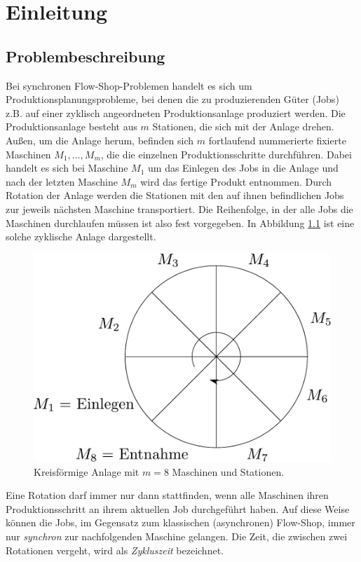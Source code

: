 \documentclass{scrreprt}
\begin{document}
\tableofcontents

\chapter{Einleitung}
\section{Problembeschreibung}
\label{sec:Problembeschreibung}
Bei synchronen Flow-Shop-Problemen handelt es sich um Produktions\-planungs\-probleme,
bei denen die zu produzierenden Güter (Jobs) z.B. auf einer zyklisch angeordneten Produktionsanlage
produziert werden. Die Produktionsanlage be\-steht aus $m$ Stationen, die sich mit der Anlage drehen.
Außen, um die Anlage herum, befinden sich $m$ fortlaufend nummerierte fixierte Maschinen $M_1,\ldots,M_m$, die die einzelnen Produktionsschritte durchführen.
Dabei handelt es sich bei Maschine $M_1$ um das Einlegen des Jobs in die Anlage und nach der letzten Maschine $M_m$ wird das fertige Produkt entnommen.
Durch Rotation der Anlage werden die Stationen mit den auf ihnen befindlichen Jobs zur jeweils nächsten Maschine transportiert.
Die Reihenfolge, in der alle Jobs die Maschinen durchlaufen müssen ist also fest vorgegeben.
In Abbildung \ref{abb:Anlage} ist eine solche zyklische Anlage dargestellt.
\begin{figure}[h]
    \begin{center}
        \includegraphics[width=.6\textwidth]{graphics/anlage.pdf}
    \end{center}
    \caption{
        \label{abb:Anlage}
        Kreisförmige Anlage mit $m=8$ Maschinen und Stationen.
    }
\end{figure}
Eine Rotation darf immer nur dann stattfinden, wenn alle Maschinen ihren Produktionsschritt an ihrem aktuellen Job
durchgeführt haben. Auf diese Weise können die Jobs, im Gegensatz zum klassischen (asynchronen) Flow-Shop, 
immer nur \textit{synchron} zur nachfolgenden Maschine gelangen.
Die Zeit, die zwischen zwei Rotationen vergeht, wird als \textit{Zykluszeit} bezeichnet.
\end{document}

